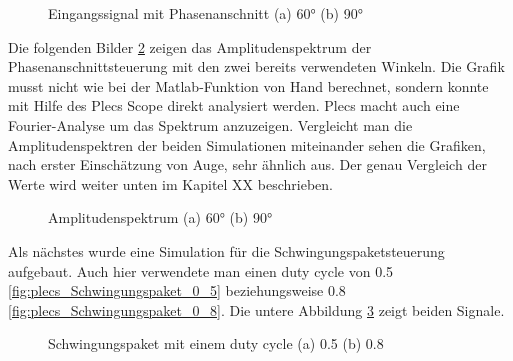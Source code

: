 \begin{figure}[ht!]
	\centering
	\qquad
	\caption{Eingangssignal mit Phasenanschnitt (a) 60° (b) 90°}
	\label{fig:Eingangssignal simuliert mit Plecs}
\end{figure}

Die folgenden Bilder \ref{fig:plecs_Amplitudenspektrum} zeigen das Amplitudenspektrum der Phasenanschnittsteuerung mit den zwei bereits verwendeten Winkeln. Die Grafik musst nicht wie bei der Matlab-Funktion von Hand berechnet, sondern konnte mit Hilfe des Plecs Scope direkt analysiert werden. Plecs macht auch eine Fourier-Analyse um das Spektrum anzuzeigen. Vergleicht man die Amplitudenspektren der beiden Simulationen miteinander sehen die Grafiken, nach erster Einschätzung von Auge, sehr ähnlich aus. Der genau Vergleich der Werte wird weiter unten im Kapitel XX beschrieben.   
     
\begin{figure}[ht!]
	\centering
	\qquad
	\caption{Amplitudenspektrum (a) 60° (b) 90°}
	\label{fig:plecs_Amplitudenspektrum}
\end{figure}

Als nächstes wurde eine Simulation für die Schwingungspaketsteuerung aufgebaut. Auch hier verwendete man einen duty cycle von 0.5 \ref{fig:plecs_Schwingungspaket_0_5} beziehungsweise 0.8 \ref{fig:plecs_Schwingungspaket_0_8}. Die untere Abbildung \ref{fig:plecs_Schwingungspakete} zeigt beiden Signale.  
\begin{figure}[ht!]
	\centering
	\qquad
	\caption{Schwingungspaket mit einem duty cycle (a) 0.5 (b) 0.8}
	\label{fig:plecs_Schwingungspakete}
\end{figure}

